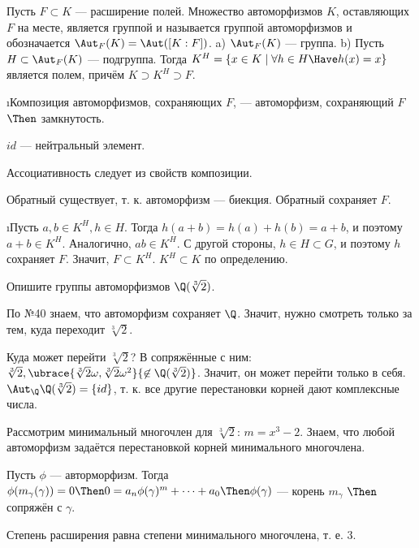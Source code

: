 \begin{problem}
Пусть $F \subset K$ — расширение полей. Множество автоморфизмов $K$, оставляющих $F$ на месте, является группой и называется группой автоморфизмов и обозначается $\Aut_F(K) = \Aut([K : F])$.
a) $\Aut_F(K)$ — группа.
b) Пусть $H \subset \Aut_F(K)$ --- подгруппа. Тогда $K^H = \{x \in K \mid \forall h \in H \Have h(x) = x\}$ является полем, причём $K \supset K^H \supset F$.
\end{problem}
\begin{solution}
\begin{enumerate}
\def\labelenumi{\alph{enumi})}
\i Композиция автоморфизмов, сохраняющих \(F\), --- автоморфизм, сохраняющий \(F\) \(\Then\) замкнутость.

\(id\) --- нейтральный элемент.

Ассоциативность следует из свойств композиции.

Обратный существует, т. к. автоморфизм --- биекция. Обратный сохраняет \(F\).

\i Пусть \(a, b \in K^H, h \in H\). Тогда \(h(a + b) = h(a) + h(b) = a + b\), и поэтому \(a + b \in K^H\). Аналогично, \(ab \in K^H\). С другой стороны, \(h \in H \subset G\), и поэтому \(h\) сохраняет \(F\). Значит, \(F \subset K^H\).
\(K^H \subset K\) по определению.
\end{enumerate}
\end{solution}

\begin{problem}[42 (10.5)]
Опишите группы автоморфизмов $\Q(\sqrt[3]{2})$.
\end{problem}
\begin{solution}
По №40 знаем, что автоморфизм сохраняет $\Q$. Значит, нужно смотреть только за тем, куда переходит $\sqrt[3]{2}$.

Куда может перейти $\sqrt[3]{2}$? В сопряжённые с ним: $\sqrt[3]{2}, \ubrace{\sqrt[3]{2}\omega, \sqrt[3]{2}\omega^2}{\not\in \Q(\sqrt[3]{2})}$. Значит, он может перейти только в себя. \(\Aut_\Q \Q(\sqrt[3]{2}) = \{id\}\), т. к. все другие перестановки корней дают комплексные числа.

Рассмотрим минимальный многочлен для $\sqrt[3]{2}$: $m = x^3-2$.
Знаем, что любой автоморфизм задаётся перестановкой корней минимального многочлена.

Пусть \(\phi\) --- авторморфизм. Тогда \(\phi(m_\gamma(\gamma)) = 0 \Then 0 = a_n \phi(\gamma)^m+\dots+a_0 \Then \phi(\gamma)\) --- корень \(m_\gamma\) \(\Then\) сопряжён с \(\gamma\).

Степень расширения равна степени минимального многочлена, т. е. $3$.
\end{solution}

